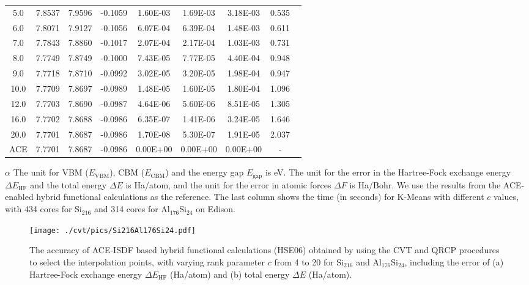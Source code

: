 \begin{table}[htbp]
\begin{threeparttable}
\begin{tabular}{cccccccc}
			 5.0 & 7.8537 & 7.9596 & -0.1059 &  1.60E-03 &  1.69E-03 &  3.18E-03 &  0.535 \ \\
			 6.0 & 7.8071 & 7.9127 & -0.1056 &  6.07E-04 &  6.39E-04 &  1.48E-03 &  0.611 \ \\
			 7.0 & 7.7843 & 7.8860 & -0.1017 &  2.07E-04 &  2.17E-04 &  1.03E-03 &  0.731 \ \\
			 8.0 & 7.7749 & 7.8749 & -0.1000 &  7.43E-05 &  7.77E-05 &  4.40E-04 &  0.948 \ \\
			 9.0 & 7.7718 & 7.8710 & -0.0992 &  3.02E-05 &  3.20E-05 &  1.98E-04 &  0.947 \ \\
			10.0 & 7.7709 & 7.8697 & -0.0989 &  1.48E-05 &  1.60E-05 &  1.80E-04 &  1.096 \ \\
			12.0 & 7.7703 & 7.8690 & -0.0987 &  4.64E-06 &  5.60E-06 &  8.51E-05 &  1.305 \ \\
			16.0 & 7.7702 & 7.8688 & -0.0986 &  6.35E-07 &  1.41E-06 &  3.24E-05 &  1.646 \ \\
			20.0 & 7.7701 & 7.8687 & -0.0986 &  1.70E-08 &  5.30E-07 &  1.91E-05 &  2.037 \ \\
			 ACE & 7.7701 & 7.8687 & -0.0986 &  0.00E+00 &  0.00E+00 &  0.00E+00 &  - \ \\
		\end{tabular}
		\begin{tablenotes}
			\item[$\alpha$] The unit for VBM ($E_\text{VBM}$), CBM ($E_\text{CBM}$)
			and the energy gap $E_\text{gap}$ is eV. The unit for the error in the
			Hartree\hyp{}Fock exchange energy ${\Delta}E_\text{HF}$ and the total
			energy ${\Delta}E$ is Ha/atom, and the unit for the error in atomic forces
			${\Delta}F$ is Ha/Bohr. We use the results from the ACE\hyp{}enabled
			hybrid functional calculations as the reference. The last column shows the
			time (in seconds) for K\hyp{}Means with different $c$ values, with 434
			cores for Si$_{216}$ and 314 cores for Al$_{176}$Si$_{24}$ on Edison.
		\end{tablenotes}
	\end{threeparttable}
\end{table}

\begin{figure}[htbp]
	\begin{center}
		\texttt{[image: ./cvt/pics/Si216Al176Si24.pdf]}
	\end{center}
	\caption{The accuracy of ACE\hyp{}ISDF based hybrid functional calculations 
	(HSE06) obtained by using the CVT and QRCP procedures to select the
	interpolation points, with varying rank parameter $c$ from 4 to 20 for Si$_
	{216}$ and Al$_{176}$Si$_{24}$, including the error of (a) Hartree\hyp{}Fock
	exchange energy ${\Delta}E_\text{HF}$ (Ha/atom) and (b) total energy $
	{\Delta}E$ (Ha/atom).}\label{fig:Si216Al176Si24}
\end{figure}

